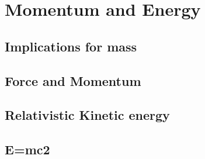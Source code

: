 
\section{Momentum and Energy}

\subsection{Implications for mass}

\subsection{Force and Momentum}

\subsection{Relativistic Kinetic energy}

\subsection{E=mc2}
